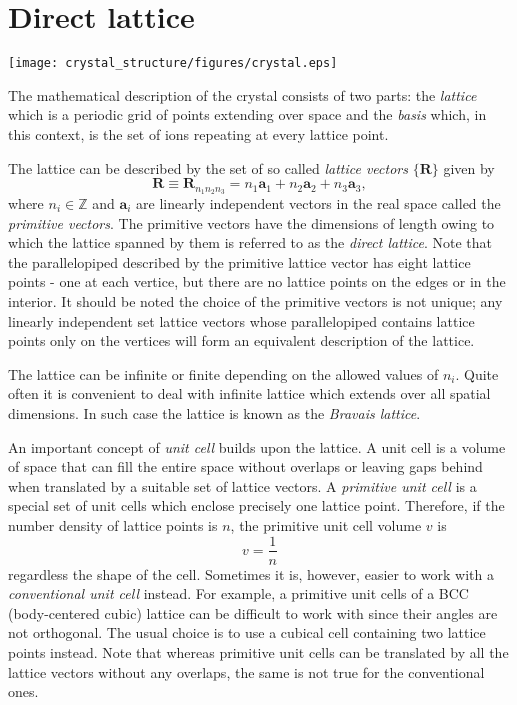 \section{Direct lattice}

\vspace*{0.5cm}
\begin{center}
\texttt{[image: crystal\_structure/figures/crystal.eps]}
\end{center}

\noindent
The mathematical description of the crystal consists of two parts: the \emph{lattice} which is a periodic grid of points extending over space and the \emph{basis} which, in this context, is the set of ions repeating at every lattice point.

The lattice can be described by the set of so called \emph{lattice vectors} $\lbrace\mathbf{R}\rbrace$ given by
\begin{equation}\label{eq:direct_lattice}
\mathbf{R} \equiv \mathbf{R}_{n_1 n_2 n_3}  = n_1 \mathbf{a}_1 + n_2 \mathbf{a}_2 + n_3 \mathbf{a}_3,
\end{equation}
where $n_i \in \mathds{Z}$ and $\mathbf{a}_i$ are linearly independent vectors in the real space called the \emph{primitive vectors}. The primitive vectors have the dimensions of length owing to which the lattice spanned by them is referred to as the \emph{direct lattice}. Note that the parallelopiped described by the primitive lattice vector has eight lattice points - one at each vertice, but there are no lattice points on the edges or in the interior. It should be noted the choice of the primitive vectors is not unique; any linearly independent set lattice vectors whose parallelopiped contains lattice points only on the vertices will form an equivalent description of the lattice.

The lattice can be infinite or finite depending on the allowed values of $n_i$. Quite often it is convenient to deal with infinite lattice which extends over all spatial dimensions. In such case the lattice is known as the \emph{Bravais lattice}. 

An important concept of \emph{unit cell} builds upon the lattice. A unit cell is a volume of space that can fill the entire space without overlaps or leaving gaps behind when translated by a suitable set of lattice vectors. A \emph{primitive unit cell} is a special set of unit cells which enclose precisely one lattice point. Therefore, if the number density of lattice points is $n$, the primitive unit cell volume $v$ is 
\begin{equation}
v = \frac{1}{n}
\end{equation}
regardless the shape of the cell. Sometimes it is, however, easier to work with a \emph{conventional unit cell} instead. For example, a primitive unit cells of a BCC (body-centered cubic) lattice can be difficult to work with since their angles are not orthogonal. The usual choice is to use a cubical cell containing two lattice points instead. Note that whereas primitive unit cells can be translated by all the lattice vectors without any overlaps, the same is not true for the conventional ones. 

